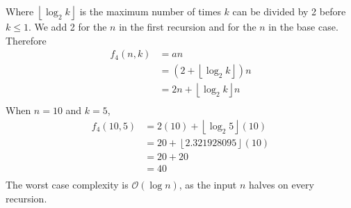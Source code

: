 Where $\left\lfloor\log_2{k}\right\rfloor$ is the maximum number of times $k$ can be divided by 2 before $k\le1$. We add 2 for the $n$ in the first recursion and for the $n$ in the base case.\\
Therefore
\begin{align*}
    f_4(n,k) & =an                                      \\
             & =(2+\left\lfloor\log_2{k}\right\rfloor)n \\
             & =2n+\left\lfloor\log_2{k}\right\rfloor n \\
\end{align*}
When $n=10$ and $k=5$,
\begin{align*}
    f_4(10, 5) & =2(10)+\left\lfloor\log_2{5}\right\rfloor(10) \\
               & =20+\left\lfloor2.321928095\right\rfloor(10)  \\
               & =20+20                                        \\
               & =40                                           \\
\end{align*}
The worst case complexity is $\mathcal{O}(\log{n})$, as the input $n$ halves on every recursion.
\clearpage